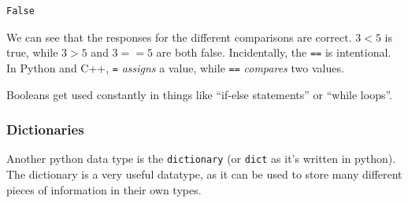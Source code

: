             \begin{tcolorbox}[breakable, size=fbox, boxrule=.5pt, pad at break*=1mm, opacityfill=0]
\begin{Verbatim}[commandchars=\\\{\}]
False
\end{Verbatim}
\end{tcolorbox}
        
    We can see that the responses for the different comparisons are correct.
\(3 < 5\) is true, while \(3 > 5\) and \(3 == 5\) are both false.
Incidentally, the \texttt{==} is intentional. In Python and C++,
\texttt{=} \emph{assigns} a value, while \texttt{==} \emph{compares} two
values.

Booleans get used constantly in things like ``if-else statements'' or
``while loops''.

\hypertarget{dictionaries}{%
\subsubsection{Dictionaries}\label{dictionaries}}

Another python data type is the \texttt{dictionary} (or \texttt{dict} as
it's written in python). The dictionary is a very useful datatype, as it
can be used to store many different pieces of information in their own
types.


